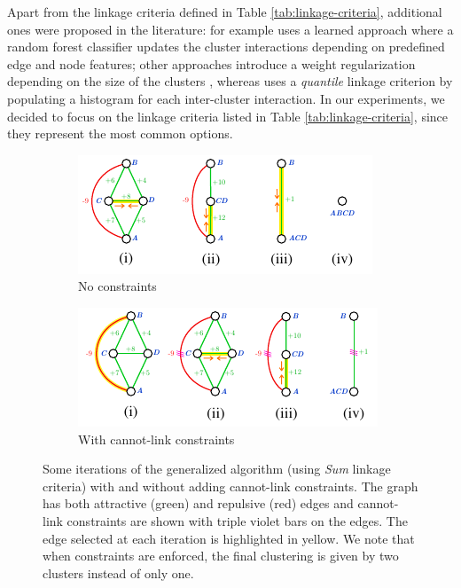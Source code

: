 Apart from the linkage criteria defined in Table \ref{tab:linkage-criteria}, additional ones were proposed in the literature:
\cite{nunez2013machine} for example uses a learned approach where a random forest classifier updates the cluster interactions depending on predefined edge and node features; other approaches introduce a weight regularization depending on the size of the clusters \cite{felzenszwalb2004efficient,kardoostsolving}, whereas 
\cite{funke2018large} uses a \emph{quantile} linkage criterion by populating a histogram for each inter-cluster interaction. In our experiments, we decided to focus on the linkage criteria listed in Table \ref{tab:linkage-criteria}, since they represent the most common options.

\begin{figure}[t]
\centering
        \begin{subfigure}[t]{0.46 \textwidth}
        \centering
        \includegraphics[width=\textwidth]{figs/example_no_constr.pdf}
        \caption{No constraints}\label{subfig:no_constraints}
    \end{subfigure} \hfill \vspace{8pt}
    \begin{subfigure}[t]{0.46 \textwidth}
        \centering
        \includegraphics[width=\textwidth]{figs/example_with_constr.pdf}
        \caption{With cannot-link constraints}\label{subfig:with_constraints}
    \end{subfigure}
\caption{Some iterations of the generalized algorithm (using \emph{Sum} linkage criteria) with and without adding cannot-link constraints. The graph has both attractive (green) and repulsive (red) edges and cannot-link constraints are shown with triple violet bars on the edges. The edge selected at each iteration is highlighted in yellow. We note that when constraints are enforced, the final clustering is given by two clusters instead of only one.}
\label{fig:algorithm_with_without_CLC}
\end{figure}



